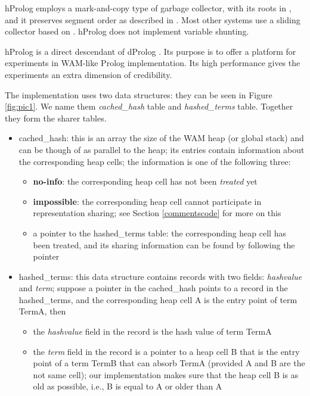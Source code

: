 \documentclass{tlp}
\begin{document}
hProlog employs a mark-and-copy type of garbage collector, with its roots
in \cite{BevemyrLindgren@PLILP-94}, and it preserves segment order as
described in \cite{VandeginsteSagonasDemoenPADL2002}. Most other
systems use a sliding collector based on
\cite{SicstusGarbage@CACM-88}.  hProlog does not implement variable
shunting.


hProlog is a direct descendant of dProlog \cite{wamvariations}. Its 
purpose is to offer a platform for experiments in WAM-like Prolog
implementation. Its high performance gives the experiments an extra
dimension of credibility.

The implementation uses two data structures: they can be seen in Figure
\ref{fig:pic1}. We name them {\em cached\_hash} table and {\em
hashed\_terms} table. Together they form the sharer tables.
\begin{itemize}
\item 
cached\_hash: this is an array the size of the WAM heap (or global stack)
and can be though of as parallel to the heap; its entries contain
information about the corresponding heap cells; the information is one
of the following three:
\begin{itemize}
\item 
{\bf no-info}: the corresponding heap cell has not been {\em treated}
yet
\item 
{\bf impossible}: the corresponding heap cell cannot participate in
representation sharing; see Section \ref{commentscode} for more on
this
\item 
a pointer to the hashed\_terms table: the corresponding heap cell has
been treated, and its sharing information can be found by following
the pointer
\end{itemize}

\item 
hashed\_terms: this data structure contains records with two fields:
{\em hashvalue} and {\em term}; suppose a pointer in the cached\_hash
points to a record in the hashed\_terms, and the corresponding heap
cell A is the entry point of term TermA, then
\begin{itemize}
\item 
the {\em hashvalue} field in the record is the hash value of term TermA
\item 
the {\em term} field in the record is a pointer to a
heap cell B that is the entry point of a term TermB that can absorb
TermA (provided A and B are the not same cell); our implementation
makes sure that the heap cell B is as old as possible, i.e., B is equal
to A or older than A
\end{itemize}

\end{itemize}
\end{document}
